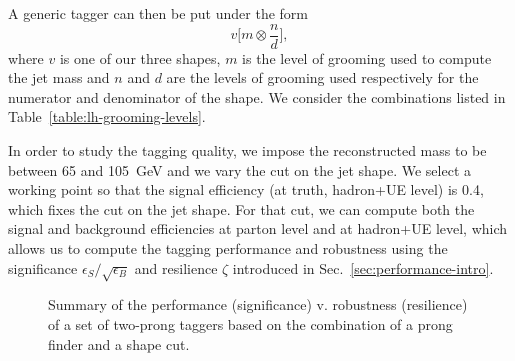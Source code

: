 %
A generic tagger can then be put under the form
\begin{equation}
v\Big[m\otimes\frac{n}{d}\Big],
\end{equation}
where $v$ is one of our three shapes, $m$ is the level of grooming used
to compute the jet mass and $n$ and $d$ are the levels of grooming
used respectively for the numerator and denominator of the shape. We
consider the combinations listed in
Table~\ref{table:lh-grooming-levels}.

In order to study the tagging quality, we impose the reconstructed mass to
be between 65 and 105~GeV and we vary the cut on the jet shape.
%
We select a working point so that the signal efficiency (at truth, \ie
hadron+UE level) is 0.4, which fixes the cut on the jet shape. For
that cut, we can compute both the signal and background efficiencies
at parton level and at hadron+UE level, which allows us to compute the
tagging performance and robustness using the significance
$\epsilon_S/\sqrt{\epsilon_B}$ and resilience $\zeta$ introduced in
Sec.~\ref{sec:performance-intro}.
%
\begin{figure}
  \centering
  \hfill%
  \caption{Summary of the performance (significance) v. robustness
    (resilience) of a set of two-prong taggers based on the
    combination of a prong finder and a shape
    cut. }\label{fig:lh2017-optimal}
\end{figure}
